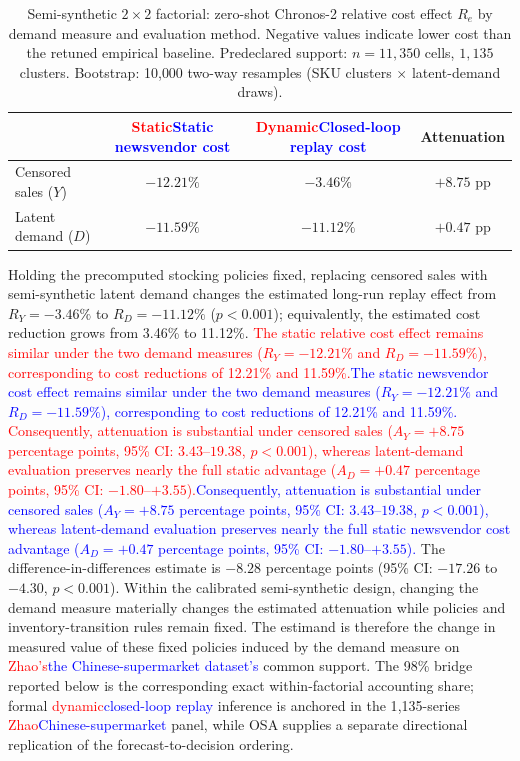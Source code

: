 \documentclass[msom,dblanonrev]{informs4}
\newcommand{\add}[1]{\textcolor{blue}{#1}}
\newcommand{\reduce}[1]{\textcolor{red}{#1}\hspace{0.5em}}
\begin{document}
\begin{table}[ht]
\caption{Semi-synthetic $2\times 2$ factorial: zero-shot Chronos-2 relative cost effect $R_e$ by demand measure and evaluation method. Negative values indicate lower cost than the retuned empirical baseline. Predeclared support: $n = 11{,}350$ cells, $1{,}135$ clusters. Bootstrap: 10{,}000 two-way resamples (SKU clusters $\times$ latent-demand draws).}\label{tab:halfsynthetic}
\centering\small
\begin{tabular}{lccc}
\toprule
& \reduce{\textbf{Static}}\add{\textbf{Static newsvendor cost}} & \reduce{\textbf{Dynamic}}\add{\textbf{Closed-loop replay cost}} & \textbf{Attenuation} \\
\midrule
Censored sales ($Y$)   & $-12.21\%$ & $-3.46\%$  & $+8.75$ pp \\
Latent demand ($D$)     & $-11.59\%$ & $-11.12\%$ & $+0.47$ pp \\
\bottomrule
\end{tabular}
\end{table}

Holding the precomputed stocking policies fixed, replacing censored sales with semi-synthetic latent demand changes the estimated long-run replay effect from $R_Y=-3.46\%$ to $R_D=-11.12\%$ ($p < 0.001$); equivalently, the estimated cost reduction grows from 3.46\% to 11.12\%.
\reduce{The static relative cost effect remains similar under the two demand measures ($R_Y=-12.21\%$ and $R_D=-11.59\%$), corresponding to cost reductions of 12.21\% and 11.59\%.}\add{The static newsvendor cost effect remains similar under the two demand measures ($R_Y=-12.21\%$ and $R_D=-11.59\%$), corresponding to cost reductions of 12.21\% and 11.59\%.}
\reduce{Consequently, attenuation is substantial under censored sales ($A_Y = +8.75$ percentage points, 95\% CI: $3.43$--$19.38$, $p < 0.001$), whereas latent-demand evaluation preserves nearly the full static advantage ($A_D = +0.47$ percentage points, 95\% CI: $-1.80$--$+3.55$).}\add{Consequently, attenuation is substantial under censored sales ($A_Y = +8.75$ percentage points, 95\% CI: $3.43$--$19.38$, $p < 0.001$), whereas latent-demand evaluation preserves nearly the full static newsvendor cost advantage ($A_D = +0.47$ percentage points, 95\% CI: $-1.80$--$+3.55$).}
The difference-in-differences estimate is $-8.28$ percentage points (95\% CI: $-17.26$ to $-4.30$, $p < 0.001$).
Within the calibrated semi-synthetic design, changing the demand measure materially changes the estimated attenuation while policies and inventory-transition rules remain fixed.
The estimand is therefore the change in measured value of these fixed policies induced by the demand measure on \reduce{Zhao's}\add{the Chinese-supermarket dataset's} common support.
The 98\% bridge reported below is the corresponding exact within-factorial accounting share; formal \reduce{dynamic}\add{closed-loop replay} inference is anchored in the 1{,}135-series \reduce{Zhao}\add{Chinese-supermarket} panel, while OSA supplies a separate directional replication of the forecast-to-decision ordering.
\end{document}
